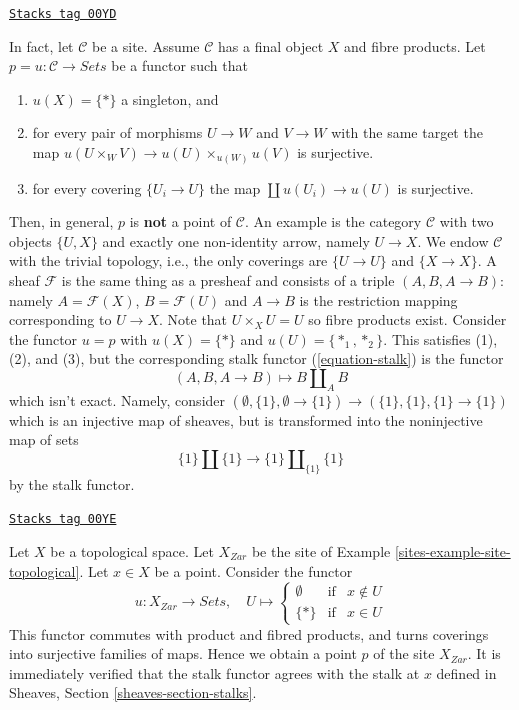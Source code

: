 \begin{remark}
\label{sites-remark-improve-proposition-points-limits}
\href{https://stacks.math.columbia.edu/tag/00YD}{\texttt{Stacks tag 00YD}}

In fact, let $\mathcal{C}$ be a site. Assume $\mathcal{C}$ has a final object
$X$  and fibre products. Let $p = u: \mathcal{C} \to \textit{Sets}$ be a
functor such that
\begin{enumerate}
\item $u(X) = \{*\}$ a singleton, and
\item for every pair of morphisms $U \to W$ and $V \to W$ with
the same target the map
$u(U \times_W V) \to u(U) \times_{u(W)} u(V)$ is surjective.
\item for every covering $\{U_i \to U\}$ the map
$\coprod u(U_i) \to u(U)$ is surjective.
\end{enumerate}
Then, in general, $p$ is {\bf not} a point of $\mathcal{C}$.
An example is the category $\mathcal{C}$ with two objects $\{U, X\}$
and exactly one non-identity arrow, namely $U \to X$. We endow $\mathcal{C}$
with the trivial topology, i.e., the only coverings are $\{U \to U\}$ and
$\{X \to X\}$. A sheaf $\mathcal{F}$ is the same thing as a presheaf and
consists of a triple $(A, B, A \to B)$: namely $A = \mathcal{F}(X)$,
$B = \mathcal{F}(U)$ and $A \to B$ is the restriction mapping corresponding
to $U \to X$. Note that $U \times_X U = U$ so fibre products exist.
Consider the functor $u = p$ with $u(X) = \{*\}$ and $u(U) = \{*_1, *_2\}$.
This satisfies (1), (2), and (3), but the corresponding stalk functor
(\ref{equation-stalk}) is the functor
$$
(A, B, A \to B) \longmapsto B \amalg_A B
$$
which isn't exact. Namely, consider
$(\emptyset, \{1\}, \emptyset \to \{1\}) \to (\{1\}, \{1\}, \{1\} \to \{1\})$
which is an injective map of sheaves, but is transformed into the noninjective
map of sets
$$
\{1\} \amalg \{1\} \longrightarrow \{1\} \amalg_{\{1\}} \{1\}
$$
by the stalk functor.
\end{remark}

\begin{example}
\label{sites-example-point-topological}
\href{https://stacks.math.columbia.edu/tag/00YE}{\texttt{Stacks tag 00YE}}

Let $X$ be a topological space. Let $X_{Zar}$ be the site of
Example \ref{sites-example-site-topological}.
Let $x \in X$ be a point. Consider the functor
$$
u : X_{Zar} \longrightarrow \textit{Sets}, \quad
U \mapsto
\left\{
\begin{matrix}
\emptyset & \text{if} & x \not \in U \\
\{*\} & \text{if} & x \in U
\end{matrix}
\right.
$$
This functor commutes with product and fibred products,
and turns coverings into surjective families of maps.
Hence we obtain a point $p$ of the site $X_{Zar}$.
It is immediately verified that the stalk functor
agrees with the stalk at $x$ defined in
Sheaves, Section
\ref{sheaves-section-stalks}.
\end{example}

